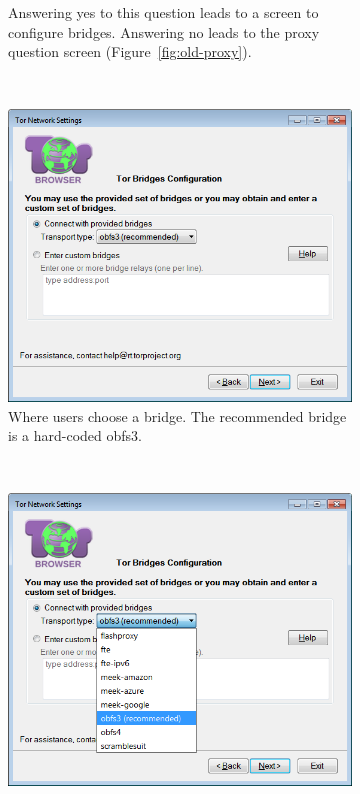 \documentclass[USenglish,oneside,twocolumn]{article}
\begin{document}
\begin{figure}
\begin{subfigure}[b]{0.30\textwidth}
	\centering\captionsetup{width=1.5\linewidth}%
	\caption{Answering yes to this question leads to a screen to configure bridges. Answering no leads to the proxy question screen (Figure~\ref{fig:old-proxy}).}
	\label{fig:old-bridge}
\end{subfigure}
~~~~~~~~~~
\begin{subfigure}[b]{0.30\textwidth}
	\includegraphics[width=\textwidth]{screenshots/OLD-bridgeSettings.png}
	\centering\captionsetup{width=1.5\linewidth}%
	\caption{Where users choose a bridge. The recommended bridge is a hard-coded obfs3.}
	\label{fig:old-bridge-settings}
\end{subfigure}
~~~~~~~~~~~~~~~~~~~~~~~~~
\begin{subfigure}[b]{0.30\textwidth}
	\includegraphics[width=\textwidth]{screenshots/OLD-bridgeSettings-combobox.png}

\end{subfigure}
\end{figure}
\end{document}
